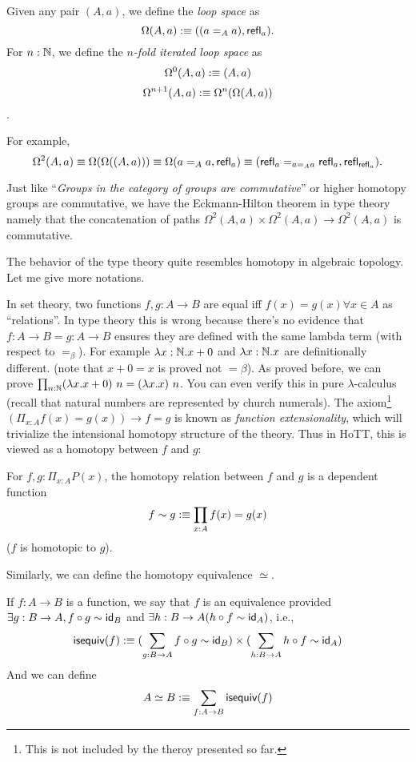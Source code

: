 \begin{definition}
    Given any pair $(A, a)$, we define the {\it loop space} as 
    $$ \Omega(A,a):\equiv ((a=_A a),\text{\sf refl}_a).$$
    For $n:\mathbb{N}$, we define the {\it$n$-fold iterated loop space} as
    $$\Omega^0(A,a):\equiv(A,a)$$
    $$\Omega^{n+1}(A,a):\equiv\Omega^n(\Omega(A, a))$$.
\end{definition}

For example, 
$$
    \Omega^2(A,a)\equiv\Omega(\Omega((A,a)))\equiv\Omega(a=_Aa,\text{\sf refl}_a)
    \equiv(\text{\sf refl}_a=_{a=_Aa}\text{\sf refl}_a, \text{\sf refl}_{\text{\sf refl}_a}).
$$

Just like ``{\it Groups in the category of groups are commutative}''
\cite{cat-awodey} or higher homotopy groups are commutative, we have
the Eckmann-Hilton theorem in type theory namely that the concatenation of 
paths $\Omega^2(A,a)\times\Omega^2(A,a)\to\Omega^2(A,a)$ is commutative.

The behavior of the type theory quite resembles homotopy in algebraic
topology. Let me give more notations.

In set theory, two functions $f,g: A\to B$ are equal iff 
$f(x)=g(x)\forall x\in A$ as ``relations''. In type theory this is wrong
because there's no evidence that $f: A\to B=g: A\to B$ ensures they are
defined with the same lambda term (with respect to $=_\beta$). For example 
$\lambda x:\mathbb{N}. x+0$ and $\lambda x:\mathbb{N}. x$ are definitionally different.
(note that $x+0=x$ is proved not $=\beta$). As proved before, we can
prove $\prod_{n:\nat}(\lambda x.x+0)\ n=(\lambda x.x)\ n$. You can even
verify this in pure $\lambda$-calculus (recall that natural numbers are
represented by church numerals). 
The axiom\footnote{This is not included by the theroy presented so far.}
$(\Pi_{x:A}f(x)=g(x))\to f = g$ is known as {\it function extensionality},
which will trivialize the intensional homotopy structure of the theory.
Thus in HoTT, this is viewed as a homotopy between $f$ and $g$:
\begin{definition}
    For $f,g:\Pi_{x:A}P(x)$, the homotopy relation between $f$ and $g$
    is a dependent function
    $$
        f\sim g:\equiv \prod_{x:A}f(x)=g(x)
    $$
    ($f$ is homotopic to $g$).
\end{definition}

\newcommand{\isequiv}{\name{isequiv}}
Similarly, we can define the homotopy equivalence $\simeq$.
\begin{definition}
    If $f:A\to B$ is a function, we say that $f$ is an equivalence provided
    $\exists g:B\to A,f\circ g\sim \text{\sf id}_B$ and 
    $\exists h:B\to A(h\circ f\sim \text{\sf id}_A)$, i.e., 
    $$
        \isequiv(f)\defn(\sum_{g:B\to A}f\circ g\sim \id_B)\times
        (\sum_{h:B\to A}h\circ f\sim \id_A)
    $$
    And we can define
    $$
        A\simeq B\defn\sum_{f:A\to B}\isequiv(f)
    $$
\end{definition}

